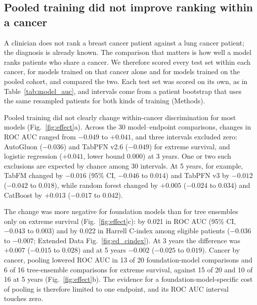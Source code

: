 \documentclass[11pt, a4paper, onecolumn, confidential, copyright]{hawkfranklin}
\begin{document}
\begin{table}[ht]
\centering
\caption{Pooled shortcut and cancer-held-out diagnostics (ROC AUC). Controls were computed on a single earlier split; the best evaluated model is the frozen-benchmark mean for each endpoint. Structural zero denotes the zero-pattern control.}
\label{tab:shortcuts}

\end{table}

\subsection*{Pooled training did not improve ranking within a cancer}

A clinician does not rank a breast cancer patient against a lung cancer patient; the diagnosis is already known. The comparison that matters is how well a model ranks patients who share a cancer. We therefore scored every test set within each cancer, for models trained on that cancer alone and for models trained on the pooled cohort, and compared the two. Each test set was scored on its own, as in Table~\ref{tab:model_auc}, and intervals come from a patient bootstrap that uses the same resampled patients for both kinds of training (Methods).

Pooled training did not clearly change within-cancer discrimination for most models (Fig.~\ref{fig:effect}a). Across the 30 model--endpoint comparisons, changes in ROC AUC ranged from $-0.049$ to $+0.041$, and three intervals excluded zero: AutoGluon ($-0.036$) and TabPFN v2.6 ($-0.049$) for extreme survival, and logistic regression ($+0.041$, lower bound 0.000) at 3 years. One or two such exclusions are expected by chance among 30 intervals. At 5 years, for example, TabFM changed by $-0.016$ (95\% CI, $-0.046$ to $0.014$) and TabPFN v3 by $-0.012$ ($-0.042$ to $0.018$), while random forest changed by $+0.005$ ($-0.024$ to $0.034$) and CatBoost by $+0.013$ ($-0.017$ to $0.042$).

The change was more negative for foundation models than for tree ensembles only on extreme survival (Fig.~\ref{fig:effect}c): by 0.021 in ROC AUC (95\% CI, $-0.043$ to $0.003$) and by 0.022 in Harrell C-index among eligible patients ($-0.036$ to $-0.007$; Extended Data Fig.~\ref{fig:ed_cindex}). At 3 years the difference was $+0.007$ ($-0.015$ to $0.028$) and at 5 years $-0.002$ ($-0.025$ to $0.019$). Cancer by cancer, pooling lowered ROC AUC in 13 of 20 foundation-model comparisons and 6 of 16 tree-ensemble comparisons for extreme survival, against 15 of 20 and 10 of 16 at 5 years (Fig.~\ref{fig:effect}b). The evidence for a foundation-model-specific cost of pooling is therefore limited to one endpoint, and its ROC AUC interval touches zero.
\end{document}
